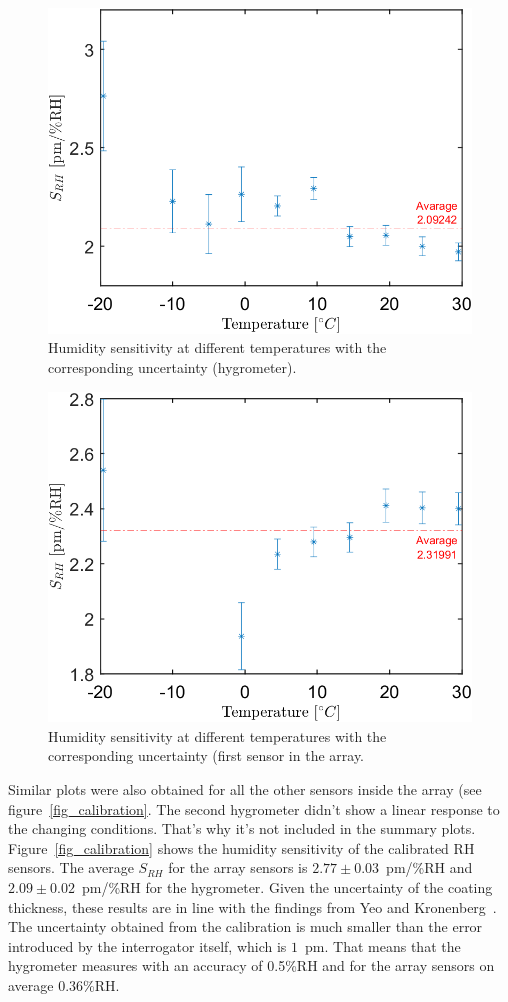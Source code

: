 \begin{figure}[!h]
\centering
\includegraphics[width=0.55\columnwidth]{Chapter5/images/RHS_RH.png}
\caption{Humidity sensitivity at different temperatures with the corresponding uncertainty (hygrometer).}
\label{fig_RH_sens}
\end{figure}
\begin{figure}[!h]
\centering
\includegraphics[width=0.55\columnwidth]{Chapter5/images/RH1_RH.png}
\caption{Humidity sensitivity at different temperatures with the corresponding uncertainty (first sensor in the array.}
\label{fig_RH_sens2}
\end{figure}
Similar plots were also obtained for all the other sensors inside the array (see figure~\ref{fig_calibration}. The second hygrometer didn't show a linear response to the changing conditions. That's why it's not included in the summary plots. Figure~\ref{fig_calibration} shows the humidity sensitivity of the calibrated \gls{RH} sensors. The average $S_{RH}$ for the array sensors is $2.77\pm0.03$~pm/\%RH  and $2.09\pm0.02$~pm/\%RH for the hygrometer. Given the uncertainty of the coating thickness, these results are in line with the findings from Yeo and Kronenberg~\cite{Kronenberg:02,YEO_PI}. The uncertainty obtained from the calibration is much smaller than the error introduced by the interrogator itself, which is $1$~pm. That means that the hygrometer measures with an accuracy of 0.5\%RH and for the array sensors on average $0.36$\%RH. 
